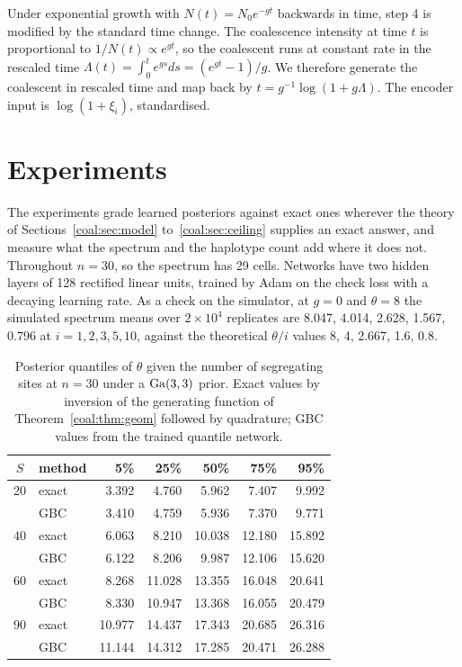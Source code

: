 \begin{sloppypar}Under exponential growth with $N(t)=N_0e^{-gt}$ backwards in time, step 4 is modified by the standard time change. The coalescence intensity at time $t$ is proportional to $1/N(t)\propto e^{gt}$, so the coalescent runs at constant rate in the rescaled time $\Lambda(t)=\int_0^te^{gs}ds=(e^{gt}-1)/g$. We therefore generate the coalescent in rescaled time and map back by $t=g^{-1}\log(1+g\Lambda)$. The encoder input is $\log(1+\xi_i)$, standardised.\end{sloppypar}

\section{Experiments}\label{coal:sec:exp}

The experiments grade learned posteriors against exact ones wherever the theory of Sections~\ref{coal:sec:model} to~\ref{coal:sec:ceiling} supplies an exact answer, and measure what the spectrum and the haplotype count add where it does not. Throughout $n=30$, so the spectrum has 29 cells. Networks have two hidden layers of 128 rectified linear units, trained by Adam on the check loss with a decaying learning rate. As a check on the simulator, at $g=0$ and $\theta=8$ the simulated spectrum means over $2\times10^4$ replicates are 8.047, 4.014, 2.628, 1.567, 0.796 at $i=1,2,3,5,10$, against the theoretical $\theta/i$ values 8, 4, 2.667, 1.6, 0.8.

\begin{table}[t]
\centering
\small
\setlength{\tabcolsep}{4.5pt}
\begin{tabular}{clrrrrr}
\toprule
$S$ & method & 5\% & 25\% & 50\% & 75\% & 95\%\\
\midrule
20 & exact & 3.392 & 4.760 & 5.962 & 7.407 & 9.992\\
   & GBC   & 3.410 & 4.759 & 5.936 & 7.370 & 9.771\\
40 & exact & 6.063 & 8.210 & 10.038 & 12.180 & 15.892\\
   & GBC   & 6.122 & 8.206 & 9.987 & 12.106 & 15.620\\
60 & exact & 8.268 & 11.028 & 13.355 & 16.048 & 20.641\\
   & GBC   & 8.330 & 10.947 & 13.368 & 16.055 & 20.479\\
90 & exact & 10.977 & 14.437 & 17.343 & 20.685 & 26.316\\
   & GBC   & 11.144 & 14.312 & 17.285 & 20.471 & 26.288\\
\bottomrule
\end{tabular}
\caption{Posterior quantiles of $\theta$ given the number of segregating sites at $n=30$ under a $\mathrm{Ga}(3,3)$ prior. Exact values by inversion of the generating function of Theorem~\ref{coal:thm:geom} followed by quadrature; GBC values from the trained quantile network.}
\label{coal:tab:exact}
\end{table}

